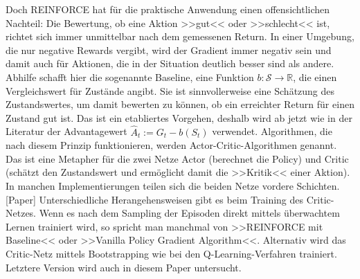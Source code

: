 Doch REINFORCE hat für die praktische Anwendung einen offensichtlichen Nachteil: Die Bewertung, ob eine Aktion >>gut<< oder >>schlecht<< ist, richtet sich immer unmittelbar nach dem gemessenen Return.
In einer Umgebung, die nur negative Rewards vergibt, wird der Gradient immer negativ sein und damit auch für Aktionen, die in der Situation deutlich besser sind als andere.
Abhilfe schafft hier die sogenannte Baseline, eine Funktion $b: \mathcal{S} \rightarrow \mathbb{R}$, die einen Vergleichswert für Zustände angibt.
Sie ist sinnvollerweise eine Schätzung des Zustandswertes, um damit bewerten zu können, ob ein erreichter Return für einen Zustand gut ist.
Das ist ein etabliertes Vorgehen, deshalb wird ab jetzt wie in der Literatur der Advantagewert $\hat{A}_t := G_t - b(S_t)$ verwendet.
Algorithmen, die nach diesem Prinzip funktionieren, werden Actor-Critic-Algorithmen genannt.
Das ist eine Metapher für die zwei Netze Actor (berechnet die Policy) und Critic (schätzt den Zustandswert und ermöglicht damit die >>Kritik<< einer Aktion).
In manchen Implementierungen teilen sich die beiden Netze vordere Schichten. [Paper]
Unterschiedliche Herangehensweisen gibt es beim Training des Critic-Netzes.
Wenn es nach dem Sampling der Episoden direkt mittels überwachtem Lernen trainiert wird, so spricht man manchmal von >>REINFORCE mit Baseline<< oder >>Vanilla Policy Gradient Algorithm<<.
Alternativ wird das Critic-Netz mittels Bootstrapping wie bei den Q-Learning-Verfahren trainiert.
Letztere Version wird auch in diesem Paper untersucht.

